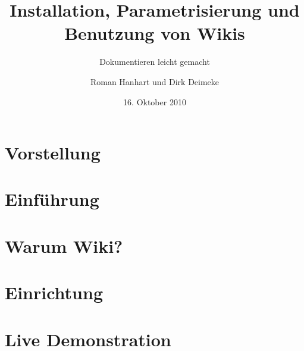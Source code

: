 \documentclass{beamer}
\title[Wikis]{Installation, Parametrisierung und Benutzung von Wikis}
\subtitle[Dokumentieren leicht gemacht]{Dokumentieren leicht gemacht}
\author[]{Roman Hanhart und Dirk Deimeke}
\institute{Ubucon 2010}
\date{16. Oktober 2010}
\begin{document}
\frame{\titlepage}

\section{Vorstellung} 



\section{Einführung}


\section{Warum Wiki?} 



\section{Einrichtung}



\section{Live Demonstration}

\end{document}
